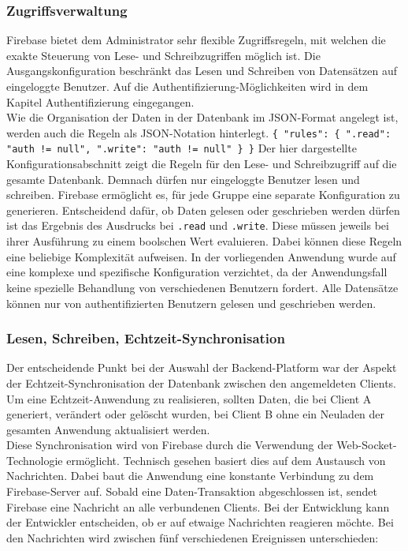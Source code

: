 \subsubsection{Zugriffsverwaltung}
Firebase bietet dem Administrator sehr flexible Zugriffsregeln, mit welchen die exakte Steuerung von Lese- und Schreibzugriffen möglich ist.
Die Ausgangskonfiguration beschränkt das Lesen und Schreiben von Datensätzen auf eingeloggte Benutzer. Auf die Authentifizierung-Möglichkeiten wird in dem Kapitel Authentifizierung eingegangen.\\
Wie die Organisation der Daten in der Datenbank im JSON-Format angelegt ist, werden auch die Regeln als JSON-Notation hinterlegt.
\texttt{\{
         "rules": \{
           ".read": "auth != null",
           ".write": "auth != null"
         \}
       \}}
Der hier dargestellte Konfigurationsabschnitt zeigt die Regeln für den Lese- und Schreibzugriff auf die gesamte Datenbank. Demnach dürfen nur eingeloggte Benutzer lesen und schreiben. Firebase ermöglicht es, für jede Gruppe eine separate Konfiguration zu generieren.
Entscheidend dafür, ob Daten gelesen oder geschrieben werden dürfen ist das Ergebnis des Ausdrucks bei \texttt{.read} und \texttt{.write}. Diese müssen jeweils bei ihrer Ausführung zu einem boolschen Wert evaluieren. Dabei können diese Regeln eine beliebige
Komplexität aufweisen.
In der vorliegenden Anwendung wurde auf eine komplexe und spezifische Konfiguration verzichtet, da der Anwendungsfall keine spezielle Behandlung von verschiedenen Benutzern fordert.
Alle Datensätze können nur von authentifizierten Benutzern gelesen und geschrieben werden.

\subsubsection{Lesen, Schreiben, Echtzeit-Synchronisation}
Der entscheidende Punkt bei der Auswahl der Backend-Platform war der Aspekt der Echtzeit-Synchronisation der Datenbank zwischen den angemeldeten Clients.
Um eine Echtzeit-Anwendung zu realisieren, sollten Daten, die bei Client A generiert, verändert oder gelöscht wurden, bei Client B ohne ein Neuladen der gesamten Anwendung aktualisiert werden.\\
Diese Synchronisation wird von Firebase durch die Verwendung der Web-Socket-Technologie ermöglicht. Technisch gesehen basiert dies auf dem Austausch von Nachrichten. Dabei baut die Anwendung eine konstante Verbindung
zu dem Firebase-Server auf. Sobald eine Daten-Transaktion abgeschlossen ist, sendet Firebase eine Nachricht an alle verbundenen Clients. Bei der Entwicklung kann der Entwickler entscheiden, ob er auf etwaige Nachrichten reagieren möchte.
Bei den Nachrichten wird zwischen fünf verschiedenen Ereignissen unterschieden:

